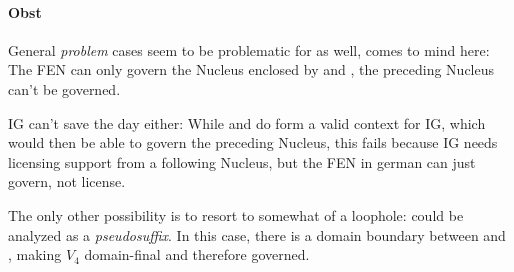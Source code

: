 
\paragraph{Obst}
General \emph{problem} cases seem to be problematic for
\CVCV as well,  %
comes to mind here:
The \gls{FEN} can only govern the Nucleus enclosed by
\ti{[s]} and \ti{[t]}, the preceding Nucleus can't be governed.

\begin{structure}
  \wordstart
  \emptyV
  \emptyV
  \fen
\end{structure}

\gls{IG} can't save the day either:
While \ti{[s]} and \ti{[t]} do form a valid context for \gls{IG},
which would then be able to govern the preceding Nucleus,
this fails because \gls{IG} needs licensing support from a following
Nucleus, but the \gls{FEN} in german can just govern, not license.

The only other possibility is to resort to somewhat of a loophole:
\ti{[st]} could be analyzed as a \emph{pseudosuffix}.
In this case, there is a domain boundary between \ti{[p]}
and \ti{[s]}, making $V_4$
domain-final and therefore governed.

